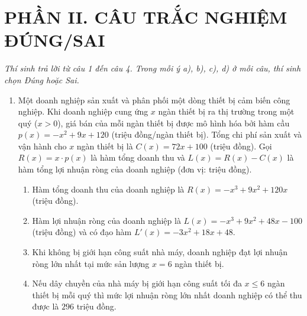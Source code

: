 \documentclass[12pt,a4paper]{article}
\begin{document}
\section*{\large PHẦN II. CÂU TRẮC NGHIỆM ĐÚNG/SAI}
\textit{Thí sinh trả lời từ câu 1 đến câu 4. Trong mỗi ý a), b), c), d) ở mỗi câu, thí sinh chọn Đúng hoặc Sai.}

\begin{enumerate}[label=\textbf{Câu \arabic*:}, leftmargin=*]

\item Một doanh nghiệp sản xuất và phân phối một dòng thiết bị cảm biến công nghiệp. Khi doanh nghiệp cung ứng $x$ ngàn thiết bị ra thị trường trong một quý ($x > 0$), giá bán của mỗi ngàn thiết bị được mô hình hóa bởi hàm cầu $p(x) = -x^2 + 9x + 120$ (triệu đồng/ngàn thiết bị). Tổng chi phí sản xuất và vận hành cho $x$ ngàn thiết bị là $C(x) = 72x + 100$ (triệu đồng). Gọi $R(x) = x \cdot p(x)$ là hàm tổng doanh thu và $L(x) = R(x) - C(x)$ là hàm tổng lợi nhuận ròng của doanh nghiệp (đơn vị: triệu đồng).
\begin{enumerate}[label=\alph*)]
    \item Hàm tổng doanh thu của doanh nghiệp là $R(x) = -x^3 + 9x^2 + 120x$ (triệu đồng).
    \item Hàm lợi nhuận ròng của doanh nghiệp là $L(x) = -x^3 + 9x^2 + 48x - 100$ (triệu đồng) và có đạo hàm $L'(x) = -3x^2 + 18x + 48$.
    \item Khi không bị giới hạn công suất nhà máy, doanh nghiệp đạt lợi nhuận ròng lớn nhất tại mức sản lượng $x = 6$ ngàn thiết bị.
    \item Nếu dây chuyền của nhà máy bị giới hạn công suất tối đa $x \le 6$ ngàn thiết bị mỗi quý thì mức lợi nhuận ròng lớn nhất doanh nghiệp có thể thu được là $296$ triệu đồng.
\end{enumerate}


\end{enumerate}
\end{document}
